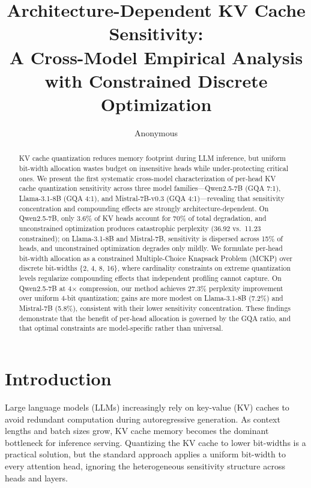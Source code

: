 \documentclass[11pt]{article}
\title{Architecture-Dependent KV Cache Sensitivity:\\A Cross-Model Empirical Analysis with Constrained Discrete Optimization}
\author{Anonymous}
\date{}
\begin{document}
\maketitle

\begin{abstract}
KV cache quantization reduces memory footprint during LLM inference, but uniform bit-width allocation wastes budget on insensitive heads while under-protecting critical ones.
We present the first systematic cross-model characterization of per-head KV cache quantization sensitivity across three model families---Qwen2.5-7B (GQA 7:1), Llama-3.1-8B (GQA 4:1), and Mistral-7B-v0.3 (GQA 4:1)---revealing that sensitivity concentration and compounding effects are strongly architecture-dependent.
On Qwen2.5-7B, only 3.6\% of KV heads account for 70\% of total degradation, and unconstrained optimization produces catastrophic perplexity (36.92 vs.\ 11.23 constrained); on Llama-3.1-8B and Mistral-7B, sensitivity is dispersed across 15\% of heads, and unconstrained optimization degrades only mildly.
We formulate per-head bit-width allocation as a constrained Multiple-Choice Knapsack Problem (MCKP) over discrete bit-widths \{2, 4, 8, 16\}, where cardinality constraints on extreme quantization levels regularize compounding effects that independent profiling cannot capture.
On Qwen2.5-7B at 4$\times$ compression, our method achieves 27.3\% perplexity improvement over uniform 4-bit quantization; gains are more modest on Llama-3.1-8B (7.2\%) and Mistral-7B (5.8\%), consistent with their lower sensitivity concentration.
These findings demonstrate that the benefit of per-head allocation is governed by the GQA ratio, and that optimal constraints are model-specific rather than universal.
\end{abstract}

\section{Introduction}
\label{sec:intro}

Large language models (LLMs) increasingly rely on key-value (KV) caches to avoid redundant computation during autoregressive generation.
As context lengths and batch sizes grow, KV cache memory becomes the dominant bottleneck for inference serving.
Quantizing the KV cache to lower bit-widths is a practical solution, but the standard approach applies a uniform bit-width to every attention head, ignoring the heterogeneous sensitivity structure across heads and layers.
\end{document}
